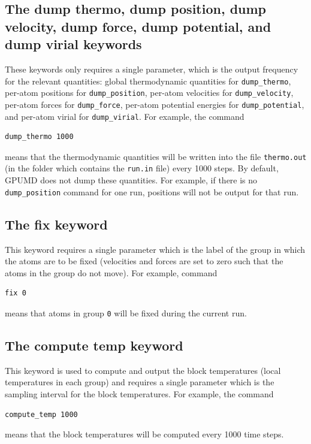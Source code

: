 \documentclass[12pt,a4paper]{report}
\begin{document}
\subsection{The dump thermo, dump position, dump velocity, dump force, dump potential, and dump virial keywords}

These keywords only requires a single parameter, which is the output frequency for the relevant quantities: global thermodynamic quantities for \verb"dump_thermo", per-atom positions for  \verb"dump_position", per-atom velocities for \verb"dump_velocity",  per-atom forces for \verb"dump_force", per-atom  potential energies for \verb"dump_potential", and per-atom virial for \verb"dump_virial".
For example, the command
\begin{verbatim}
dump_thermo 1000
\end{verbatim}
means that the thermodynamic quantities will be written into the file \verb"thermo.out" (in the folder which contains the \verb"run.in" file) every 1000 steps.
By default, GPUMD does not dump these quantities. For example, if there is no \verb"dump_position" command for one run, positions will not be output for that run.


\subsection{The fix keyword}

This keyword requires a single parameter which is the label of the group in which the atoms are to be fixed (velocities and forces are set to zero such that the atoms in the group do not move). For example, command
\begin{verbatim}
fix 0
\end{verbatim}
means that atoms in group \verb"0" will be fixed during the current run.



\subsection{The compute temp keyword}

This keyword is used to compute and output the block temperatures (local temperatures in each group) and requires a single parameter which is the sampling interval for the block temperatures. For example, the command
\begin{verbatim}
compute_temp 1000
\end{verbatim}
means that the block temperatures will be computed every 1000 time steps.
\end{document}
